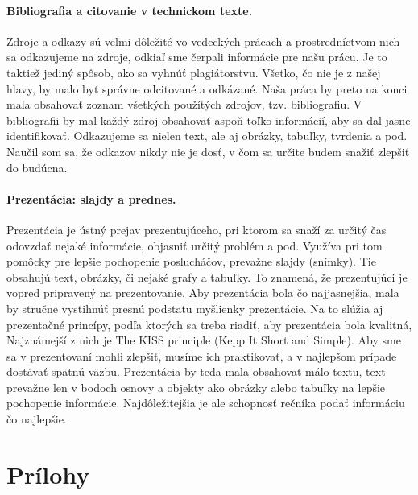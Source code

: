 \documentclass[10pt,slovak,a4paper]{article}
\begin{document}
\paragraph{Bibliografia a citovanie v technickom texte.} \label{Reakcia2}

Zdroje a odkazy sú veľmi dôležité vo vedeckých prácach a prostredníctvom nich sa odkazujeme na zdroje, odkiaľ sme čerpali informácie pre našu prácu. Je to taktiež jediný spôsob, ako sa vyhnúť plagiátorstvu. Všetko, čo nie je z našej hlavy, by malo byť správne odcitované a odkázané. Naša práca by preto na konci mala obsahovať zoznam všetkých použítých zdrojov, tzv. bibliografiu. V bibliografii by mal každý zdroj obsahovať aspoň toľko informácií, aby sa dal jasne identifikovať. Odkazujeme sa nielen text, ale aj obrázky, tabuľky, tvrdenia a pod. Naučil som sa, že odkazov nikdy nie je dosť, v čom sa určite budem snažiť zlepšiť do budúcna. 

\paragraph{Prezentácia: slajdy a prednes.} \label{Reakcia3}

Prezentácia je ústný prejav prezentujúceho, pri ktorom sa snaží za určitý čas odovzdať nejaké informácie, objasniť určitý problém a pod. Využíva pri tom pomôcky pre lepšie pochopenie poslucháčov, prevažne slajdy (snímky). Tie obsahujú text, obrázky, či nejaké grafy a tabuľky. To znamená, že prezentujúci je vopred pripravený na prezentovanie. Aby prezentácia bola čo najjasnejšia, mala by stručne vystihnúť presnú podstatu myšlienky prezentácie. Na to slúžia aj prezentačné princípy, podľa ktorých sa treba riadiť, aby prezentácia bola kvalitná, Najznámejší z nich je The KISS principle (Kepp It Short and Simple). Aby sme sa v prezentovaní mohli zlepšiť, musíme ich praktikovať, a v najlepšom prípade dostávať spätnú väzbu. Prezentácia by teda mala obsahovať málo textu, text prevažne len v bodoch osnovy a objekty ako obrázky alebo tabuľky na lepšie pochopenie informácie. Najdôležitejšia je ale schopnosť rečníka podať informáciu čo najlepšie.

\clearpage

\section{Prílohy} \label{Prilohy}
\end{document}
